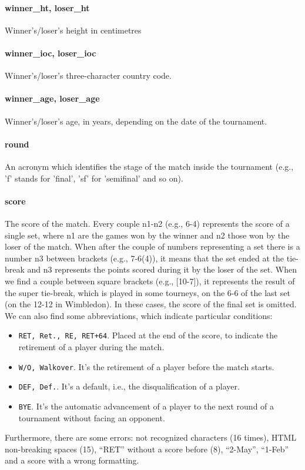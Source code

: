 \documentclass{article}
\begin{document}
\paragraph{winner\_ht, loser\_ht}
Winner's/loser's height in centimetres

\paragraph{winner\_ioc, loser\_ioc}
Winner's/loser's three-character country code.

\paragraph{winner\_age, loser\_age}
Winner's/loser's age, in years, depending on the date of the tournament.

\paragraph{round}
An acronym which identifies the stage of the match inside the tournament (e.g., 'f' stands for 'final', 'sf' for 'semifinal' and so on).

\paragraph{score}
The score of the match.
Every couple n1-n2 (e.g., 6-4) represents the score of a single set, where n1 are the games won by the winner and n2 those won by the loser of the match.
When after the couple of numbers representing a set there is a number n3 between brackets (e.g., 7-6(4)), it means that the set ended at the tie-break and n3 represents the points scored during it by the loser of the set.
When we find a couple between square brackets (e.g., [10-7]), it represents the result of the super tie-break, which is played in some tourneys, on the 6-6 of the last set (on the 12-12 in Wimbledon). In these cases, the score of the final set is omitted.
We can also find some abbreviations, which indicate particular conditions:
\begin{itemize}
    \item \verb|RET, Ret., RE, RET+64|. Placed at the end of the score, to indicate the retirement of a player during the match.
    \item \verb|W/O, Walkover|. It's the retirement of a player before the match starts. 
    \item \verb|DEF, Def.|. It's a default, i.e., the disqualification of a player.
    \item \verb|BYE|. It's the automatic advancement of a player to the next round of a tournament without facing an opponent.
\end{itemize}
Furthermore, there are some errors: not recognized characters (16 times), HTML non-breaking spaces (15), “RET” without a score before (8), “2-May”, “1-Feb” and a score with a wrong formatting.
\end{document}
